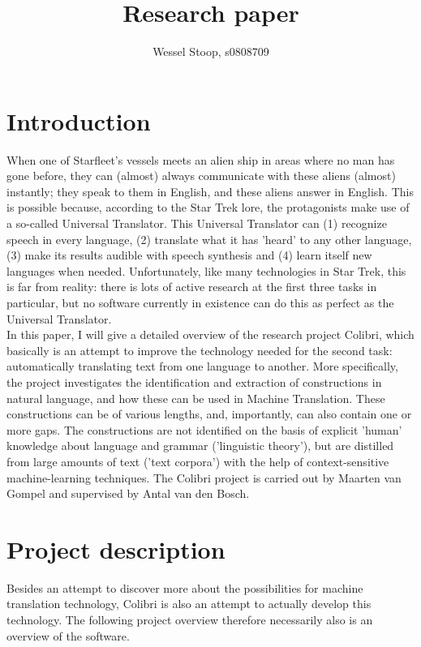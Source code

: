 \documentclass[12pt]{article}
\title{Research paper}
\author{Wessel Stoop, s0808709}
\begin{document}
\maketitle

\section{Introduction}

When one of Starfleet's vessels meets an alien ship in areas where no man has gone before, they can (almost) always communicate with these aliens (almost) instantly; they speak to them in English, and these aliens answer in English. This is possible because, according to the Star Trek lore, the protagonists make use of a so-called Universal Translator. This Universal Translator can (1) recognize speech in every language, (2) translate what it has 'heard' to any other language, (3) make its results audible with speech synthesis and (4) learn itself new languages when needed. Unfortunately, like many technologies in Star Trek, this is far from reality: there is lots of active research at the first three tasks in particular, but no software currently in existence can do this as perfect as the Universal Translator. \\\indent
In this paper, I will give a detailed overview of the research project Colibri, which basically is an attempt to improve the technology needed for the second task: automatically translating text from one language to another. More specifically, the project investigates the identification and extraction of constructions in natural language, and how these can be used in Machine Translation. These constructions can be of various lengths, and, importantly, can also contain one or more gaps. The constructions are not identified on the basis of explicit 'human' knowledge about language and grammar ('linguistic theory'), but are distilled from large amounts of text ('text corpora') with the help of context-sensitive machine-learning techniques. The Colibri project is carried out by Maarten van Gompel and supervised by Antal van den Bosch.






\section{Project description}

Besides an attempt to discover more about the possibilities for machine translation technology, Colibri is also an attempt to actually develop this technology. The following project overview therefore necessarily also is an overview of the software.
\end{document}

